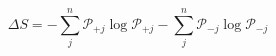 \begin{equation}
\Delta S = -\sum_j^n\mathcal P_{+j}\log\mathcal P_{+j} -\sum_j^n\mathcal P_{-j}\log\mathcal P_{-j} 
\end{equation}